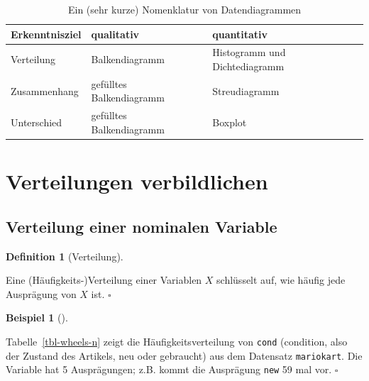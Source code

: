 \documentclass[
  letterpaper,
  twoside,
  open=any]{scrbook}
\theoremstyle{definition}
\theoremstyle{definition}
\newtheorem{example}{Beispiel}[chapter]
\theoremstyle{definition}
\newtheorem{definition}{Definition}[chapter]
\theoremstyle{remark}
\begin{document}
\begin{longtable}[]{@{}
  >{\raggedright\arraybackslash}p{}
  >{\raggedright\arraybackslash}p{}
  >{\raggedright\arraybackslash}p{}@{}}

\caption{\label{tbl-nom-plots}Ein (sehr kurze) Nomenklatur von
Datendiagrammen}

\tabularnewline

\toprule\noalign{}
\begin{minipage}[b]{\linewidth}\raggedright
Erkenntnisziel
\end{minipage} & \begin{minipage}[b]{\linewidth}\raggedright
qualitativ
\end{minipage} & \begin{minipage}[b]{\linewidth}\raggedright
quantitativ
\end{minipage} \\
\midrule\noalign{}
\endhead
\bottomrule\noalign{}
\endlastfoot
Verteilung & Balkendiagramm & Histogramm und Dichtediagramm \\
Zusammenhang & gefülltes Balkendiagramm & Streudiagramm \\
Unterschied & gefülltes Balkendiagramm & Boxplot \\

\end{longtable}

\section{Verteilungen verbildlichen}\label{verteilungen-verbildlichen}

\subsection{Verteilung einer nominalen
Variable}\label{verteilung-einer-nominalen-variable}

\begin{definition}[Verteilung]\protect\hypertarget{def-verteilung}{}\label{def-verteilung}

Eine (Häufigkeits-)Verteilung einer Variablen \(X\) schlüsselt auf, wie
häufig jede Ausprägung von \(X\) ist. \(\square\)

\end{definition}

\begin{example}[]\protect\hypertarget{exm-verteilung1}{}\label{exm-verteilung1}

Tabelle~\ref{tbl-wheels-n} zeigt die Häufigkeitsverteilung von
\texttt{cond} (condition, also der Zustand des Artikels, neu oder
gebraucht) aus dem Datensatz \texttt{mariokart}. Die Variable hat 5
Ausprägungen; z.B. kommt die Ausprägung \texttt{new} 59 mal vor.
\(\square\)

\end{example}
\end{document}
